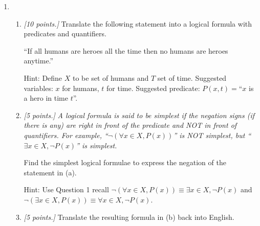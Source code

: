 \documentclass[12pt]{amsart}
\begin{document}
\begin{enumerate}[label=\arabic*.,itemsep=10pt, leftmargin=*]
\newpage
    \item 
        \begin{enumerate}
            \item 
        \textit{[10 points.]}
            Translate the following statement into a logical formula with predicates and quantifiers.
                
                ``If all humans are heroes all the time then no humans are heroes anytime.''
                
                Hint: Define $X$ to be set of humans and $T$ set of time.
            Suggested variables: $x$ for humans, 
            $t$ for time.
            Suggested predicate: 
            $P(x,t)=$``$x$ is a hero in time $t$''.
            

            \item 
        \textit{[5 points.]}
        \textit{
        A logical formula is said to be simplest if the negation signs (if there is any) 
        are right in front of the predicate and NOT in front of quantifiers. For example,
        ``$ \neg (\forall x \in X, P(x))$'' is NOT simplest, 
    but ``$\exists x \in X, \neg P(x)$'' is simplest.}

            Find the simplest logical formulae 
                to express the negation of the statement in (a).  
                
                Hint: Use Question 1 recall  $\neg (\forall x\in X, P(x)) \equiv \exists x\in X, \neg P(x)$
                and
                $\neg (\exists x\in X, P(x)) \equiv \forall x\in X, \neg P(x)$.
            \item
        \textit{[5 points.]}
            Translate the resulting formula in (b) back into English. 

        \end{enumerate}
\end{enumerate}



\printbibliography 
%
%
\end{document}
